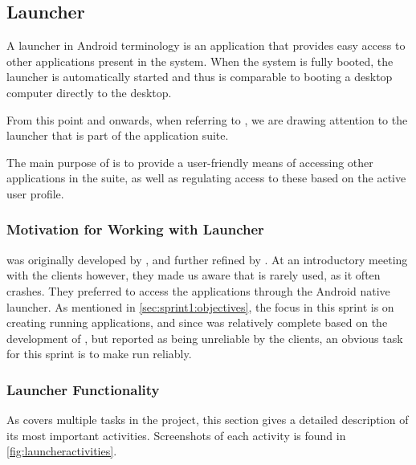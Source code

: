 \subsection{Launcher}\label{sec:launcher}
A launcher in Android terminology is an application that provides easy access to other applications present in the system.
When the system is fully booted, the launcher is automatically started and thus is comparable to booting a desktop computer directly to the desktop.

From this point and onwards, when referring to \launcher, we are drawing attention to the launcher that is part of the \giraf application suite.

The main purpose of \launcher is to provide a user-friendly means of accessing other applications in the \giraf suite, as well as regulating access to these based on the active user profile.

\subsubsection{Motivation for Working with Launcher}
\launcher was originally developed by \citet{launcher2011}, and further refined by \citet{launcher2012}.
At an introductory meeting with the clients however, they made us aware that \launcher is rarely used, as it often crashes.
They preferred to access the \giraf applications through the Android native launcher.
As mentioned in \cref{sec:sprint1:objectives}, the focus in this sprint is on creating running applications, and since \launcher was relatively complete based on the development of \citet{launcher2012}, but reported as being unreliable by the clients, an obvious task for this sprint is to make \launcher run reliably.

\subsubsection{Launcher Functionality}
As \launcher covers multiple tasks in the \giraf project, this section gives a detailed description of its most important activities.
Screenshots of each activity is found in \cref{fig:launcheractivities}.

